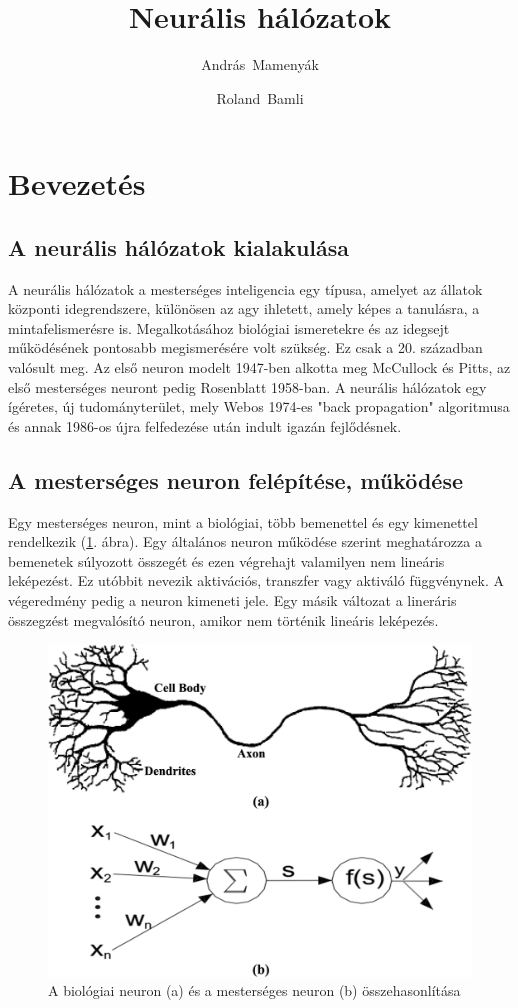\documentclass[a4paper]{article}
\author[1]{András~Mamenyák}
\author[1]{Roland~Bamli}
\affil[1]{Mérnök informatikus (BSc) szakos hallgató, Debreceni Egyetem}
\title{Neurális hálózatok}
\begin{document}
\maketitle

\section{Bevezetés}
\subsection{A neurális hálózatok kialakulása}
A neurális hálózatok a mesterséges inteligencia egy típusa, amelyet az állatok központi idegrendszere, különösen az agy ihletett, amely képes a tanulásra, a mintafelismerésre is. Megalkotásához biológiai ismeretekre és az idegsejt működésének pontosabb megismerésére volt szükség. Ez csak a 20. században valósult meg. Az első neuron modelt 1947-ben alkotta meg McCullock és Pitts, az első mesterséges neuront pedig Rosenblatt 1958-ban. A neurális hálózatok egy ígéretes, új tudományterület, mely Webos 1974-es "back propagation" algoritmusa és annak 1986-os újra felfedezése után indult igazán fejlődésnek.

\subsection{A mesterséges neuron felépítése, működése}
Egy mesterséges neuron, mint a biológiai, több bemenettel és egy kimenettel rendelkezik (\ref{artifical_neuron}. ábra). Egy általános neuron működése szerint  meghatározza a bemenetek súlyozott összegét és ezen végrehajt valamilyen nem lineáris leképezést. Ez utóbbit nevezik aktivációs, transzfer vagy aktiváló függvénynek. A végeredmény pedig a neuron kimeneti jele. Egy másik változat a lineráris összegzést megvalósító neuron, amikor nem történik lineáris leképezés.

\begin{figure}
  \centering
  \includegraphics[scale=0.6]{artifical_neuron}
  \caption{A biológiai neuron (a) és a mesterséges neuron (b) összehasonlítása}
  \label{artifical_neuron}
\end{figure}
\end{document}
